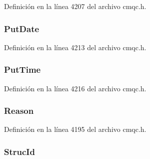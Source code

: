 Definición en la línea 4207 del archivo cmqc.\+h.

\hypertarget{structtag_m_q_d_l_h_add3e7fe139edfa323295d6c7bc764cc5}{}
\subsubsection[{Put\+Date}]{ Put\+Date}\label{structtag_m_q_d_l_h_add3e7fe139edfa323295d6c7bc764cc5}


Definición en la línea 4213 del archivo cmqc.\+h.

\hypertarget{structtag_m_q_d_l_h_aec51e7b9face9480a893ae5d47781ee7}{}
\subsubsection[{Put\+Time}]{ Put\+Time}\label{structtag_m_q_d_l_h_aec51e7b9face9480a893ae5d47781ee7}


Definición en la línea 4216 del archivo cmqc.\+h.

\hypertarget{structtag_m_q_d_l_h_ac2f0378cb0c66c5f91625822e53d7bae}{}
\subsubsection[{Reason}]{ Reason}\label{structtag_m_q_d_l_h_ac2f0378cb0c66c5f91625822e53d7bae}


Definición en la línea 4195 del archivo cmqc.\+h.

\hypertarget{structtag_m_q_d_l_h_a0530922ca944569b52601d74941f96e4}{}
\subsubsection[{Struc\+Id}]{ Struc\+Id}\label{structtag_m_q_d_l_h_a0530922ca944569b52601d74941f96e4}


